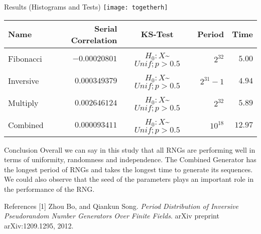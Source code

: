 \documentclass[final]{beamer}
\newlength{\colwidth}
\begin{document}
\begin{frame}[t]
\begin{columns}[t]
\begin{column}{\colwidth}
  \begin{block}{Results (Histograms and Tests)}
  \centering
  \vspace{-0.1cm}
    \texttt{[image: togetherh]}
  	
    \begin{center}
    \begingroup
    \setlength{\tabcolsep}{23pt}
    \renewcommand{\arraystretch}{1.1}
    \begin{table}
    
      \begin{tabular}{l r c r r}
        \toprule
        \centering
        \textbf{Name} & \textbf{Serial Correlation} & \textbf{KS-Test} & \textbf{Period} & \textbf{Time}\\
        \midrule 
        \centering     
        Fibonacci & $-0.00020801$ & $H_0:X$\sim$Unif;p>0.5$ & $2^{32}$ & $5.00$\\
        Inversive & $0.000349379$ & $H_0:X$\sim$Unif;p>0.5$ & $2^{31}-1$ & $4.94$\\
        Multiply &  $0.002646124$ & $H_0:X$\sim$Unif;p>0.5$ & $2^{32}$ & $5.89$\\
        Combined &  $0.000093411$ & $H_0:X$\sim$Unif;p>0.5$ & $10^{18}$ & $12.97$\\
        \bottomrule
      \end{tabular} 
       \end{table}
    \endgroup

    \end{center}


  \end{block}
\begin{block}{Conclusion}
Overall we can say in this study that all RNGs are performing well in terms of uniformity, randomness and independence. The Combined Generator has the longest period of RNGs and takes the longest time to generate its sequences. We could also observe that the seed of the parameters plays an important role in the performance of the RNG.
\end{block}

  \begin{block}{References}
    [1] Zhou Bo, and Qiankun Song. \textsl{Period Distribution of Inversive Pseudorandom Number Generators Over Finite Fields}. arXiv preprint arXiv:1209.1295, 2012.
    

\end{block}
\end{column}
\end{columns}
\end{frame}
\end{document}
